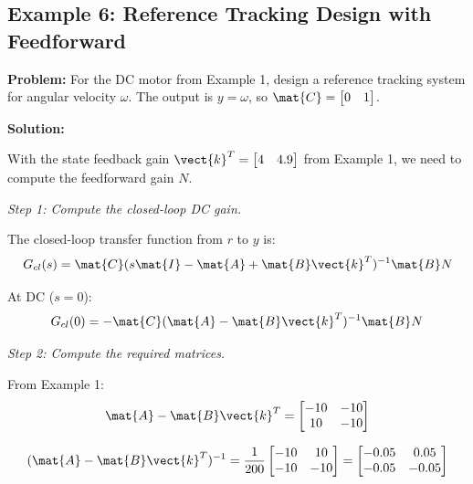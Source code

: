 \subsection{Example 6: Reference Tracking Design with Feedforward}

\textbf{Problem:} For the DC motor from Example 1, design a reference tracking system for angular velocity $\omega$. The output is $y = \omega$, so $\mat{C} = \begin{bmatrix} 0 & 1 \end{bmatrix}$.

\textbf{Solution:}

With the state feedback gain $\vect{k}^T = \begin{bmatrix} 4 & 4.9 \end{bmatrix}$ from Example 1, we need to compute the feedforward gain $N$.

\textit{Step 1: Compute the closed-loop DC gain.}

The closed-loop transfer function from $r$ to $y$ is:
\begin{equation}
G_{cl}(s) = \mat{C}(s\mat{I} - \mat{A} + \mat{B}\vect{k}^T)^{-1}\mat{B}N
\end{equation}

At DC ($s = 0$):
\begin{equation}
G_{cl}(0) = -\mat{C}(\mat{A} - \mat{B}\vect{k}^T)^{-1}\mat{B}N
\end{equation}

\textit{Step 2: Compute the required matrices.}

From Example 1:
\begin{equation}
\mat{A} - \mat{B}\vect{k}^T = \begin{bmatrix} -10 & -10 \\ 10 & -10 \end{bmatrix}
\end{equation}

\begin{equation}
(\mat{A} - \mat{B}\vect{k}^T)^{-1} = \frac{1}{200}\begin{bmatrix} -10 & 10 \\ -10 & -10 \end{bmatrix}
= \begin{bmatrix} -0.05 & 0.05 \\ -0.05 & -0.05 \end{bmatrix}
\end{equation}

